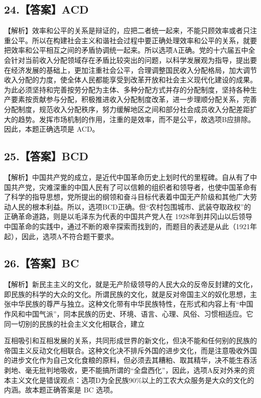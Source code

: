 \documentclass[UTF8,11pt]{ctexart}
\begin{document}
\subsection*{24.【答案】ACD}

【解析】效率和公平的关系是辩证的，应把二者统一起来，不能只顾效率或者只注重公平。所以在构建社会主义和谐社会过程中要正确处理效率和公平的关系，就要把效率和公平相互之间的矛盾协调统一起来。所以选项A正确。党的十六届五中全会针对当前收入分配领域存在矛盾比较突出的问题，以科学发展观为指导，提出要在经济发展的基础上，更加注重社会公平，合理调整国民收入分配格局，加大调节收入分配的力度，使全体人民都能享受到改革开放和社会主义现代化建设的成果。为此必须坚持和完善按劳分配为主体、多种分配方式并存的分配制度，坚持各种生产要素按贡献参与分配，积极推进收入分配制度改革，进一步理顺分配关系，完善分配制度，规范收入分配秩序，努力缓解地区之间和部分社会成员收入分配差距扩大的趋势。发挥市场机制的作用，注重的是效率，而不是公平，故选项B应排除。因此，本题正确选项是 ACD。


\subsection*{25.【答案】BCD}

【解析】中国共产党的成立，是近代中国革命历史上划时代的里程碑。自从有了中国共产党，灾难深重的中国人民有了可以信赖的组织者和领导者，也使中国革命有了科学的指导思想，党所提出的纲领和奋斗目标代表着中国无产阶级和其他广大劳动人民的根本利益。所以，选项BCD正确。但“农村包围城市、武装夺取政权”的正确革命道路，则是以毛泽东为代表的中国共产党人在 1928年到井冈山以后领导中国革命的实践中，通过不断的艰辛探索而找到的，而题目的表述是从此（1921年起），因此，选项A不符合题干要求。


\subsection*{26.【答案】BC}

【解析】新民主主义的文化，就是无产阶级领导的人民大众的反帝反封建的文化，即民族的科学的大众的文化。所谓民族的文化，就是反对帝国主义的奴化思想，主张中华民族的尊严与独立。这种文化带有中华民族特性，在形式和内容上有“中国作风和中国气派”，同本民族的历史、环境、语言、心理、风俗、习惯相适应。它同一切别的民族的社会主义文化相联合，建立


互相吸引和互相发展的关系，共同形成世界的新文化，但决不能和任何别的民族的帝国主义反动文化相联合。这种文化决不排斥外国的进步文化，而是注意吸收外国的进步文化作为自己文化食粮的原料，但必须去其糟粕、取其精华，决不能生吞活剥地、毫无批判地吸收，更不能搞所谓的“全盘西化”，因此，选项A反对外来的资本主义文化是错误观点：选项D为全民族90\%以上的工农大众服务是大众的文化的内涵。故本题正确答案是 BC 选项。
\end{document}
